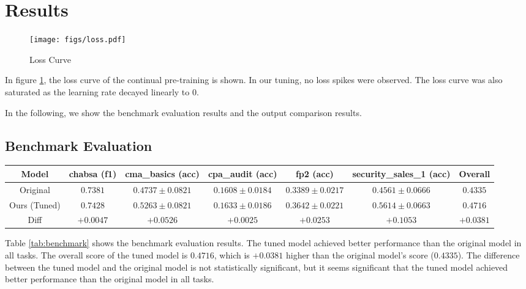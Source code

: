 \section{Results}

\begin{figure}[htb]
    \centering
    \texttt{[image: figs/loss.pdf]}
    \caption{Loss Curve}
    \label{fig:loss}
\end{figure}
In figure \ref{fig:loss}, the loss curve of the continual pre-training is shown.
In our tuning, no loss spikes were observed.
The loss curve was also saturated as the learning rate decayed linearly to 0.

In the following, we show the benchmark evaluation results and the output comparison results.

\subsection{Benchmark Evaluation}

\begin{table*}[tb]
    \centering\small
    \caption{Benchmark Evaluation Results}
    \label{tab:benchmark}
    \begin{tabular}{|c|c|c|c|c|c||c|}
        \hline
        Model        & chabsa (f1) & cma\_basics (acc) & cpa\_audit (acc)  & fp2 (acc)         & security\_sales\_1 (acc) & Overall   \\
        \hline
        Original     & $0.7381$    & $0.4737\pm0.0821$ & $0.1608\pm0.0184$ & $0.3389\pm0.0217$ & $0.4561\pm0.0666$        & $0.4335$  \\
        Ours (Tuned) & $0.7428$    & $0.5263\pm0.0821$ & $0.1633\pm0.0186$ & $0.3642\pm0.0221$ & $0.5614\pm0.0663$        & $0.4716$  \\
        \hline
        Diff         & $+0.0047$   & $+0.0526$         & $+0.0025$         & $+0.0253$         & $+0.1053$                & $+0.0381$ \\\hline
    \end{tabular}
\end{table*}

Table \ref{tab:benchmark} shows the benchmark evaluation results.
The tuned model achieved better performance than the original model in all tasks.
The overall score of the tuned model is $0.4716$, which is $+0.0381$ higher than the original model's score ($0.4335$).
The difference between the tuned model and the original model is not statistically significant, but it seems significant that the tuned model achieved better performance than the original model in all tasks.

